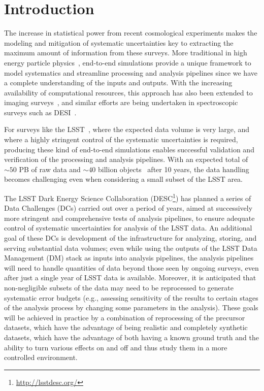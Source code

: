 \documentclass[twocolumn]{aastex62}
\begin{document}

\section{Introduction}
\label{sec:intro}
The increase in statistical power from recent cosmological experiments makes the modeling and mitigation of systematic uncertainties key to extracting the maximum amount of information from these surveys. More traditional in high energy particle physics~\citep{Brun:118715, 2006JHEP...05..026S}, end-to-end simulations provide a unique framework to
model systematics and streamline processing and analysis pipelines since we have a complete understanding of the inputs and outputs. With the increasing availability of computational resources, this approach has also been extended to imaging surveys~\citep{2016ApJ...817...25B}, and similar efforts are being undertaken in spectroscopic surveys such as DESI~\citep{2016arXiv161100036D}.

For surveys like the LSST~\citep{Overview}, where the expected data volume is very large, and where a highly stringent control of the systematic uncertainties is required, producing these
kind of end-to-end simulations enables successful validation and verification of the processing and
analysis pipelines. With an expected total of $\sim 50$ PB of raw data and $\sim 40$ billion objects~\citep{Overview} after 10 years, the
data handling becomes challenging even when considering a small subset of the LSST area.  

The LSST Dark Energy Science Collaboration
(DESC\footnote{\url{http://lsstdesc.org/}}) has planned a series of
Data Challenges (DCs) carried out over a period of years, aimed at
successively more stringent and comprehensive tests of analysis
pipelines, to ensure adequate control of systematic uncertainties for
analysis of the LSST data.  An additional goal of these DCs is
development of the infrastructure for analyzing, storing, and serving
substantial data volumes; even while using the outputs of the LSST
Data Management (DM) stack as inputs into analysis pipelines, the
analysis pipelines will need to handle quantities of data beyond those
seen by ongoing surveys, even after just a single year of LSST data is
available. Moreover, it is anticipated that non-negligible subsets of
the data may need to be reprocessed to generate systematic error
budgets (e.g., assessing sensitivity of the results to certain stages
of the analysis process by changing some parameters in the
analysis). These goals will be achieved in practice by a combination
of reprocessing of the precursor datasets, which have the advantage of
being realistic and completely synthetic datasets, which have the
advantage of both having a known ground truth and the ability to turn
various effects on and off and thus study them in a more controlled
environment.
\end{document}
